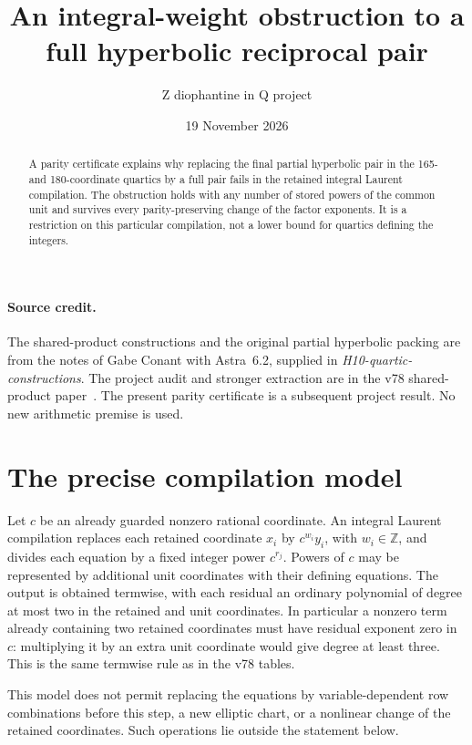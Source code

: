 \documentclass[11pt]{article}
\title{An integral-weight obstruction to a full hyperbolic reciprocal pair}
\author{Z diophantine in Q project}
\date{19 November 2026}
\newcommand{\Z}{\mathbb Z}
\begin{document}
\maketitle
\begin{abstract}
A parity certificate explains why replacing the final partial hyperbolic
pair in the 165- and 180-coordinate quartics by a full pair fails in the
retained integral Laurent compilation. The obstruction holds with any
number of stored powers of the common unit and survives every
parity-preserving change of the factor exponents. It is a restriction on
this particular compilation, not a lower bound for quartics defining the
integers.
\end{abstract}

\paragraph{Source credit.}
The shared-product constructions and the original partial hyperbolic
packing are from the notes of Gabe Conant with Astra~6.2, supplied in
\emph{H10-quartic-constructions}. The project audit and stronger extraction
are in the v78 shared-product paper~\cite{Audit}. The present parity
certificate is a subsequent project result. No new arithmetic premise is
used.

\section{The precise compilation model}
Let $c$ be an already guarded nonzero rational coordinate. An integral
Laurent compilation replaces each retained coordinate $x_i$ by
$c^{w_i}y_i$, with $w_i\in\Z$, and divides each equation by a fixed
integer power $c^{r_j}$. Powers of $c$ may be represented by additional
unit coordinates with their defining equations. The output is obtained
termwise, with each residual an ordinary polynomial of degree at most
two in the retained and unit coordinates. In particular a nonzero term
already containing two retained coordinates must have residual exponent
zero in $c$: multiplying it by an extra unit coordinate would give degree
at least three. This is the same termwise rule as in the v78 tables.

This model does not permit replacing the equations by variable-dependent
row combinations before this step, a new elliptic chart, or a nonlinear
change of the retained coordinates. Such operations lie outside the
statement below.
\end{document}
